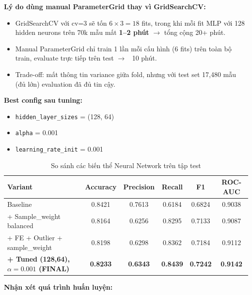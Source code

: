 \documentclass[12pt, a4paper]{article}
\begin{document}
\textbf{Lý do dùng manual ParameterGrid thay vì GridSearchCV:}

\begin{itemize}
    \item GridSearchCV với cv=3 sẽ tốn $6 \times 3 = 18$ fits, trong khi mỗi fit MLP với 128 hidden neurons trên 70k mẫu mất \textbf{1--2 phút} $\to$ tổng cộng 20+ phút.
    \item Manual ParameterGrid chỉ train 1 lần mỗi cấu hình ($6$ fits) trên toàn bộ train, evaluate trực tiếp trên test $\to$ ~10 phút.
    \item Trade-off: mất thông tin variance giữa fold, nhưng với test set 17{,}480 mẫu (đủ lớn) evaluation đã đủ tin cậy.
\end{itemize}

\textbf{Best config sau tuning:}

\begin{itemize}
    \item \texttt{hidden\_layer\_sizes} = (128, 64)
    \item \texttt{alpha} = 0.001
    \item \texttt{learning\_rate\_init} = 0.001
\end{itemize}

\begin{table}[h!]
\centering
\caption{So sánh các biến thể Neural Network trên tập test}
\renewcommand{\arraystretch}{1.3}
\begin{tabular}{|l|c|c|c|c|c|}
\hline
\textbf{Variant} & \textbf{Accuracy} & \textbf{Precision} & \textbf{Recall} & \textbf{F1} & \textbf{ROC-AUC} \\ \hline
Baseline                         & 0.8421 & 0.7613 & 0.6184 & 0.6824 & 0.9038 \\ \hline
+ Sample\_weight balanced        & 0.8164 & 0.6256 & 0.8295 & 0.7133 & 0.9087 \\ \hline
+ FE + Outlier + sample\_weight  & 0.8198 & 0.6298 & 0.8362 & 0.7184 & 0.9112 \\ \hline
\textbf{+ Tuned (128,64), $\alpha{=}0.001$ (FINAL)} & \textbf{0.8233} & \textbf{0.6343} & \textbf{0.8439} & \textbf{0.7242} & \textbf{0.9142} \\ \hline
\end{tabular}
\end{table}

\textbf{Nhận xét quá trình huấn luyện:}
\end{document}
